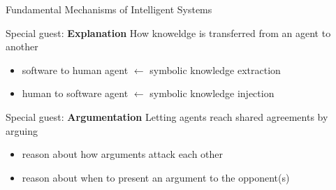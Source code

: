 \documentclass[presentation]{beamer}\mode<presentation>{\usetheme{AMSBolognaFC}}
\begin{document}
\begin{frame}[c,allowframebreaks]{Fundamental Mechanisms of Intelligent Systems}
%
\framebreak
%
\begin{block}{Special guest: \textbf{Explanation}}
	How knoweldge is \alert{transferred} from an agent to another
	\begin{itemize}
		\item software to human agent $\leftarrow$ symbolic knowledge \alert{extraction}
		\item human to software agent $\leftarrow$ symbolic knowledge \alert{injection}
	\end{itemize}
\end{block}
%
\begin{block}{Special guest: \textbf{Argumentation}}
	Letting agents reach shared agreements by \alert{arguing}
	\begin{itemize}
		\item reason about how arguments attack each other
		\item reason about when to present an argument to the opponent(s)
	\end{itemize}
\end{block}
%
\end{frame}
\end{document}
